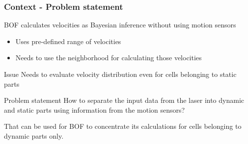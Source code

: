 \documentclass{beamer}
\begin{document}
	\begin{frame}
		\frametitle{Context - Problem statement}

		BOF calculates velocities as Bayesian inference without using motion sensors
		
		\begin{itemize}
		\item Uses pre-defined range of velocities
		\item Needs to use the neighborhood for calculating those velocities
		\end{itemize}

		 \begin{alertblock}{Issue}
		 Needs to evaluate velocity distribution even for cells belonging to static parts
		 \end{alertblock}

		
	
		\begin{block}{Problem statement}		
			How to separate the input data from the laser into dynamic and static parts using information from the motion sensors?
			
			That can be used for BOF to concentrate its calculations for cells belonging to dynamic parts only.
		\end{block}
		
	\end{frame}
\end{document}
